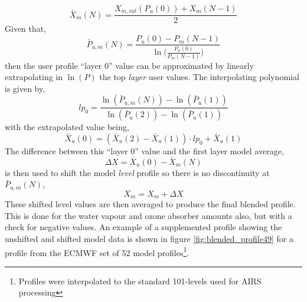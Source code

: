 \begin{equation*}
  \bar{X}_{m}\left(N\right) = \frac{X_{m,int}\left(P_{u}(0)\right) + X_{m}\left(N-1\right)}{2}
\end{equation*}
Given that,
\begin{equation*}
  \bar{P}_{u,m}\left(N\right) = \frac{P_{u}\left(0\right) - P_{m}\left(N-1\right)}{\ln{}\bigg(\frac{\displaystyle P_{u}\left(0\right)}{\displaystyle P_{m}\left(N-1\right)}\bigg)}
\end{equation*}
then the user profile ``layer 0'' value can be approximated by linearly extrapolating in $\ln{(P)}$ the top \emph{layer} user values. The interpolating polynomial is given by,
\begin{equation*}
  lp_{0} = \frac{\ln\left(\bar{P}_{u,m}\left(N\right)\right) - \ln\left(\bar{P}_{u}\left(1\right)\right)}
                {\ln\left(\bar{P}_{u}  \left(2\right)\right) - \ln\left(\bar{P}_{u}\left(1\right)\right)}
\end{equation*}
with the extrapolated value being,
\begin{equation*}
  \bar{X}_{u}(0) = \left(\bar{X}_{u}(2) - \bar{X}_{u}(1)\right)\cdot lp_{0} + \bar{X}_{u}(1)
\end{equation*}
The difference between this ``layer 0'' value and the first layer model average,
\begin{equation*}
  \Delta X = \bar{X}_{u}(0) - \bar{X}_{m}(N)
\end{equation*}
is then used to shift the model \emph{level} profile so there is no discontinuity at $\bar{P}_{u,m}\left(N\right)$,
\begin{equation*}
  X_{m} = X_{m} + \Delta X
\end{equation*}
These shifted level values are then averaged to produce the final blended profile. This is done for the water vapour and ozone absorber amounts also, but with a check for negative values. An example of a supplemented profile showing the unshifted and shifted model data is shown in figure \ref{fig:blended_profile49} for a profile from the ECMWF set of 52 model profiles\cite{ref:ecmwf_profile_set}\footnote{Profiles were interpolated to the standard 101-levels used for AIRS processing}.
